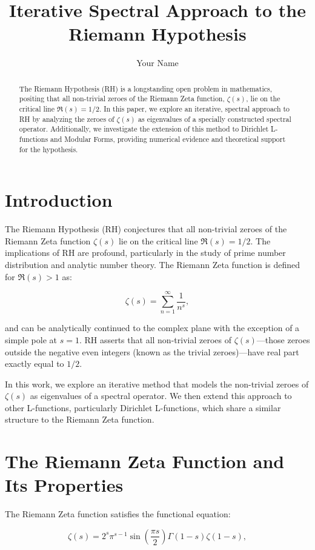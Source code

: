 \documentclass{article}
\title{Iterative Spectral Approach to the Riemann Hypothesis}
\author{Your Name}
\begin{document}
\maketitle

\begin{abstract}
The Riemann Hypothesis (RH) is a longstanding open problem in mathematics, positing that all non-trivial zeroes of the Riemann Zeta function, $\zeta(s)$, lie on the critical line $\Re(s) = 1/2$. In this paper, we explore an iterative, spectral approach to RH by analyzing the zeroes of $\zeta(s)$ as eigenvalues of a specially constructed spectral operator. Additionally, we investigate the extension of this method to Dirichlet L-functions and Modular Forms, providing numerical evidence and theoretical support for the hypothesis.
\end{abstract}

\section{Introduction}

The Riemann Hypothesis (RH) conjectures that all non-trivial zeroes of the Riemann Zeta function $\zeta(s)$ lie on the critical line $\Re(s) = 1/2$. The implications of RH are profound, particularly in the study of prime number distribution and analytic number theory. The Riemann Zeta function is defined for $\Re(s) > 1$ as:

\[
\zeta(s) = \sum_{n=1}^{\infty} \frac{1}{n^s},
\]

and can be analytically continued to the complex plane with the exception of a simple pole at $s = 1$. RH asserts that all non-trivial zeroes of $\zeta(s)$—those zeroes outside the negative even integers (known as the trivial zeroes)—have real part exactly equal to $1/2$.

In this work, we explore an iterative method that models the non-trivial zeroes of $\zeta(s)$ as eigenvalues of a spectral operator. We then extend this approach to other L-functions, particularly Dirichlet L-functions, which share a similar structure to the Riemann Zeta function.

\section{The Riemann Zeta Function and Its Properties}

The Riemann Zeta function satisfies the functional equation:

\[
\zeta(s) = 2^s \pi^{s-1} \sin\left( \frac{\pi s}{2} \right) \Gamma(1-s) \zeta(1-s),
\]
\end{document}
